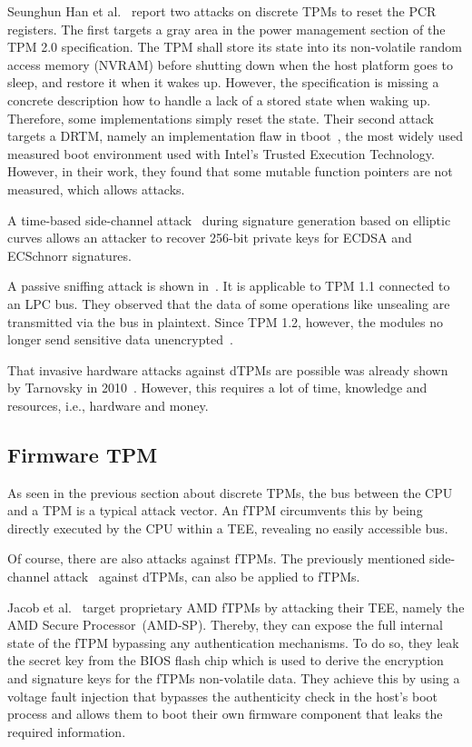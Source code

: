 Seunghun Han et al.~\cite{aBadDream} report two attacks on discrete TPMs to reset the PCR registers. The first targets a gray area in the power management section of the TPM 2.0 specification. The TPM shall store its state into its non-volatile random access memory (NVRAM) before shutting down when the host platform goes to sleep, and restore it when it wakes up. However, the specification is missing a concrete description how to handle a lack of a stored state when waking up. Therefore, some implementations simply reset the state. Their second attack targets a DRTM, namely an implementation flaw in tboot~\cite{tboot}, the most widely used measured boot environment used with Intel's Trusted Execution Technology. However, in their work, they found that some mutable function pointers are not measured, which allows attacks.

A time-based side-channel attack~\cite{Moghimi2019} during signature generation based on elliptic curves allows an attacker to recover 256-bit private keys for ECDSA and ECSchnorr signatures.

A passive sniffing attack is shown in~\cite{Kursawe2005AnalyzingTP}. It is applicable to TPM 1.1 connected to an LPC bus. They observed that the data of some operations like unsealing are transmitted via the bus in plaintext. Since TPM 1.2, however, the modules no longer send sensitive data unencrypted~\cite{Winter2013}.

That invasive hardware attacks against dTPMs are possible was already shown by Tarnovsky in 2010~\cite{tarnovsky}. However, this requires a lot of time, knowledge and resources, i.e., hardware and money.

\subsection{Firmware TPM}

As seen in the previous section about discrete TPMs, the bus between the CPU and a TPM is a typical attack vector.
An fTPM circumvents this by being directly executed by the CPU within a \ac{TEE}, revealing no easily accessible bus.

Of course, there are also attacks against fTPMs.
The previously mentioned side-channel attack~\cite{Moghimi2019} against dTPMs, can also be applied to fTPMs.

Jacob et al.~\cite{Jacob2023} target proprietary AMD fTPMs by attacking their \ac{TEE}, namely the AMD Secure Processor~(AMD-SP). Thereby, they can expose the full internal state of the fTPM bypassing any authentication mechanisms. To do so, they leak the secret key from the BIOS flash chip which is used to derive the encryption and signature keys for the fTPMs non-volatile data. They achieve this by using a voltage fault injection that bypasses the authenticity check in the host's boot process and allows them to boot their own firmware component that leaks the required information.


